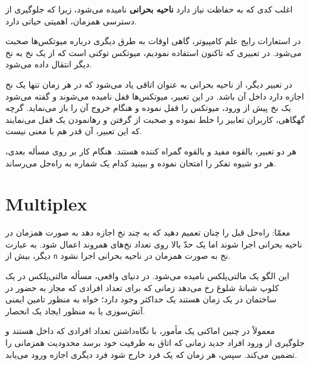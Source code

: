 \documentclass{book}
\begin{document}
    اغلب کدی که به حفاظت نیاز دارد \textbf{ناحیه بحرانی} نامیده می‌شود، 
    زیرا که جلوگیری از دسترسی همزمان، اهمیتی حیاتی دارد. 

    در استعارات رایج علم کامپیوتر، گاهی اوقات به طرق دیگری درباره میوتکس‌ها صحبت می‌شود. 
    در تعبیری که تاکنون استفاده نمودیم،  میوتکس‌ توکنی است که از یک نخ به نخ دیگر انتقال داده می‌شود. 

    در تعبیر دیگر، از ناحیه بحرانی به عنوان اتاقی یاد می‌شود که در هر زمان تنها یک نخ اجازه دارد داخل آن باشد. 
    در این تعبیر،  میوتکس‌ها قفل نامیده می‌شوند و گفته می‌شود یک نخ پیش از ورود،  میوتکس‌ را قفل نموده 
    و هنگام خروج آن را باز می‌نماید. گرچه گهگاهی، کاربران تعابیر را خلط نموده و صحبت از  گرفتن 
    و رهانمودن یک قفل می‌نمایند که این تعبیر، آن قدر هم با معنی نیست. 

    هر دو تعبیر، بالقوه مفید و بالقوه گمراه کننده هستند. 
    هنگام کار بر روی مسأله بعدی،‌ هر دو شیوه تفکر را امتحان نموده و ببینید کدام یک شماره به راه‌حل می‌رساند. 

\section{Multiplex}
    
    معمّا: راه‌حل قبل را چنان تعمیم دهید که به چند نخ اجازه دهد به صورت همزمان در ناحیه بحرانی اجرا شوند اما یک حدّ بالا روی تعداد 
    نخ‌های همروند اعمال شود. به عبارت دیگر، بیش از \texttt{n} نخ به صورت همزمان در ناحیه بحرانی اجرا نشود. 
    
    این  الگو یک مالتی‌پلکس نامیده می‌شود. در دنیای واقعی، مسأله مالتی‌پلکس در یک کلوپ شبانهٔ شلوغ
    رخ می‌دهد زمانی که برای تعداد افرادی که مجاز به حضور در ساختمان در یک زمان هستند یک حداکثر وجود دارد؛ خواه به منظور تامین ایمنی آتش‌سوزی
    یا به منظور ایجاد یک انحصار. %
    

    معمولاً در چنین اماکنی یک مأمور،  با نگاه‌داشتن تعداد افرادی که داخل هستند و 
    جلوگیری از ورود افراد جدید زمانی که اتاق به ظرفیت خود برسد محدودیت همزمانی را تضمین می‌کند.
    سپس، هر زمان که یک فرد خارج شود فرد دیگری اجازه ورود می‌یابد. 
\end{document}
